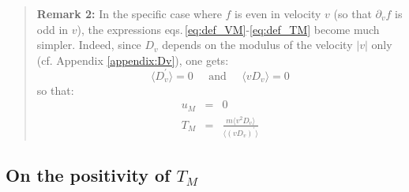 \documentclass[11pt]{article}
\begin{document}
\begin{footnotesize}
\begin{quotation}
	\textbf{Remark 2:} In the specific case where $f$ is even in velocity $v$ (so that $\partial_v f$ is odd in $v$), the expressions eqs.\,\eqref{eq:def_VM}-\eqref{eq:def_TM} become much simpler. Indeed, since $D_v$ depends on the modulus of the velocity $|v|$ only (cf. Appendix \ref{appendix:Dv}), one gets:
	\begin{equation*}
		\langle D_v^\prime \rangle = 0
		\;\;\;\;\; \textrm{and} \;\;\;\;\; \langle vD_v \rangle = 0
	\end{equation*}
	so that:
	\begin{eqnarray*}
		u_M &=& 0 \\
		T_M &=&
		\frac{m \langle v^2D_v \rangle}{\langle (v D_v)^\prime \rangle}
	\end{eqnarray*}
\end{quotation}
\end{footnotesize}


\subsection{On the positivity of $T_M$}
\end{document}
